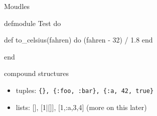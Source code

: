 \begin{frame}{Moudles}

  \begin{code}
    defmodule Test do

    def to_celsius(fahren) do
       (fahren - 32) / 1.8
    end

    end
  \end{code}
  


\end{frame}






\begin{frame}{compound structures}
 \begin{itemize}
  \pause \item {tuples:} {\tt \{\}, \{:foo, :bar\}, \{:a, 42, true\}}
  \pause \item {lists:} [], [1|[]], [1,:a,3,4]  (more on this later)
 \end{itemize}
\end{frame}



